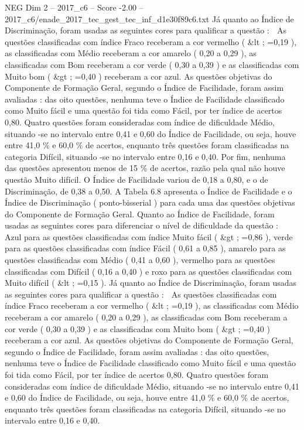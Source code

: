 \begin{textsample}{NEG Dim 2 – 2017\_c6 – Score -2.00 – 2017\_c6/enade\_2017\_tec\_gest\_tec\_inf\_d1e30f89c6.txt}
Já quanto ao Índice de Discriminação, foram usadas as seguintes cores para qualificar a questão :  As questões classificadas com índice Fraco receberam a cor vermelho ( \&lt ; =0,19 ), as classificadas com Médio receberam a cor amarelo ( 0,20 a 0,29 ), as classificadas com Bom receberam a cor verde ( 0,30 a 0,39 ) e as classificadas com Muito bom ( \&gt ; =0,40 ) receberam a cor azul.
As questões objetivas do Componente de Formação Geral, segundo o Índice de Facilidade, foram assim avaliadas : das oito questões, nenhuma teve o Índice de Facilidade classificado como Muito fácil e uma questão foi tida como Fácil, por ter índice de acertos 0,80.
Quatro questões foram consideradas com índice de dificuldade Médio, situando -se no intervalo entre 0,41 e 0,60 do Índice de Facilidade, ou seja, houve entre 41,0 \% e 60,0 \% de acertos, enquanto três questões foram classificadas na categoria Difícil, situando -se no intervalo entre 0,16 e 0,40.
Por fim, nenhuma das questões apresentou menos de 15 \% de acertos, razão pela qual não houve questão Muito difícil.
O Índice de Facilidade variou de 0,18 a 0,80, e o de Discriminação, de 0,38 a 0,50.
A Tabela 6.8 apresenta o Índice de Facilidade e o Índice de Discriminação ( ponto-bisserial ) para cada uma das questões objetivas do Componente de Formação Geral.
Quanto ao Índice de Facilidade, foram usadas as seguintes cores para diferenciar o nível de dificuldade da questão :  Azul para as questões classificadas com índice Muito fácil ( \&gt ; =0,86 ), verde para as questões classificadas com índice Fácil ( 0,61 a 0,85 ), amarelo para as questões classificadas com Médio ( 0,41 a 0,60 ), vermelho para as questões classificadas com Difícil ( 0,16 a 0,40 ) e roxo para as questões classificadas com Muito difícil ( \&lt ; =0,15 ).
Já quanto ao Índice de Discriminação, foram usadas as seguintes cores para qualificar a questão :  As questões classificadas com índice Fraco receberam a cor vermelho ( \&lt ; =0,19 ), as classificadas com Médio receberam a cor amarelo ( 0,20 a 0,29 ), as classificadas com Bom receberam a cor verde ( 0,30 a 0,39 ) e as classificadas com Muito bom ( \&gt ; =0,40 ) receberam a cor azul.
As questões objetivas do Componente de Formação Geral, segundo o Índice de Facilidade, foram assim avaliadas : das oito questões, nenhuma teve o Índice de Facilidade classificado como Muito fácil e uma questão foi tida como Fácil, por ter índice de acertos 0,80.
Quatro questões foram consideradas com índice de dificuldade Médio, situando -se no intervalo entre 0,41 e 0,60 do Índice de Facilidade, ou seja, houve entre 41,0 \% e 60,0 \% de acertos, enquanto três questões foram classificadas na categoria Difícil, situando -se no intervalo entre 0,16 e 0,40.

\end{textsample}
